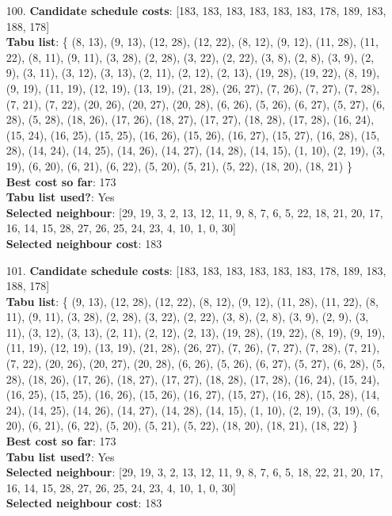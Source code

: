 \documentclass[fleqn]{article}
\begin{document}
\begin{itemize}
    \item[100.] \textbf{Candidate schedule costs}: [183, 183, 183, 183, 183, 183, 178, 189, 183, 188, 178] \\
    \textbf{Tabu list}: \{ (8, 13), (9, 13), (12, 28), (12, 22), (8, 12), (9, 12), (11, 28), (11, 22), (8, 11), (9, 11), (3, 28), (2, 28), (3, 22), (2, 22), (3, 8), (2, 8), (3, 9), (2, 9), (3, 11), (3, 12), (3, 13), (2, 11), (2, 12), (2, 13), (19, 28), (19, 22), (8, 19), (9, 19), (11, 19), (12, 19), (13, 19), (21, 28), (26, 27), (7, 26), (7, 27), (7, 28), (7, 21), (7, 22), (20, 26), (20, 27), (20, 28), (6, 26), (5, 26), (6, 27), (5, 27), (6, 28), (5, 28), (18, 26), (17, 26), (18, 27), (17, 27), (18, 28), (17, 28), (16, 24), (15, 24), (16, 25), (15, 25), (16, 26), (15, 26), (16, 27), (15, 27), (16, 28), (15, 28), (14, 24), (14, 25), (14, 26), (14, 27), (14, 28), (14, 15), (1, 10), (2, 19), (3, 19), (6, 20), (6, 21), (6, 22), (5, 20), (5, 21), (5, 22), (18, 20), (18, 21) \} \\
    \textbf{Best cost so far}: 173 \\
    \textbf{Tabu list used?}: Yes \\
    \textbf{Selected neighbour}: [29, 19, 3, 2, 13, 12, 11, 9, 8, 7, 6, 5, 22, 18, 21, 20, 17, 16, 14, 15, 28, 27, 26, 25, 24, 23, 4, 10, 1, 0, 30] \\
    \textbf{Selected neighbour cost}: 183
      

    \item[101.] \textbf{Candidate schedule costs}: [183, 183, 183, 183, 183, 183, 178, 189, 183, 188, 178] \\
    \textbf{Tabu list}: \{ (9, 13), (12, 28), (12, 22), (8, 12), (9, 12), (11, 28), (11, 22), (8, 11), (9, 11), (3, 28), (2, 28), (3, 22), (2, 22), (3, 8), (2, 8), (3, 9), (2, 9), (3, 11), (3, 12), (3, 13), (2, 11), (2, 12), (2, 13), (19, 28), (19, 22), (8, 19), (9, 19), (11, 19), (12, 19), (13, 19), (21, 28), (26, 27), (7, 26), (7, 27), (7, 28), (7, 21), (7, 22), (20, 26), (20, 27), (20, 28), (6, 26), (5, 26), (6, 27), (5, 27), (6, 28), (5, 28), (18, 26), (17, 26), (18, 27), (17, 27), (18, 28), (17, 28), (16, 24), (15, 24), (16, 25), (15, 25), (16, 26), (15, 26), (16, 27), (15, 27), (16, 28), (15, 28), (14, 24), (14, 25), (14, 26), (14, 27), (14, 28), (14, 15), (1, 10), (2, 19), (3, 19), (6, 20), (6, 21), (6, 22), (5, 20), (5, 21), (5, 22), (18, 20), (18, 21), (18, 22) \} \\
    \textbf{Best cost so far}: 173 \\
    \textbf{Tabu list used?}: Yes \\
    \textbf{Selected neighbour}: [29, 19, 3, 2, 13, 12, 11, 9, 8, 7, 6, 5, 18, 22, 21, 20, 17, 16, 14, 15, 28, 27, 26, 25, 24, 23, 4, 10, 1, 0, 30] \\
    \textbf{Selected neighbour cost}: 183
      


\end{itemize}
\end{document}

